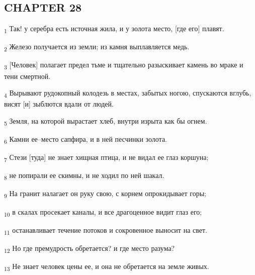 \subsection{CHAPTER 28}
\begin{tcolorbox}
\textsubscript{1} Так! у серебра есть источная жила, и у золота место, [где его] плавят.
\end{tcolorbox}
\begin{tcolorbox}
\textsubscript{2} Железо получается из земли; из камня выплавляется медь.
\end{tcolorbox}
\begin{tcolorbox}
\textsubscript{3} [Человек] полагает предел тьме и тщательно разыскивает камень во мраке и тени смертной.
\end{tcolorbox}
\begin{tcolorbox}
\textsubscript{4} Вырывают рудокопный колодезь в местах, забытых ногою, спускаются вглубь, висят [и] зыблются вдали от людей.
\end{tcolorbox}
\begin{tcolorbox}
\textsubscript{5} Земля, на которой вырастает хлеб, внутри изрыта как бы огнем.
\end{tcolorbox}
\begin{tcolorbox}
\textsubscript{6} Камни ее--место сапфира, и в ней песчинки золота.
\end{tcolorbox}
\begin{tcolorbox}
\textsubscript{7} Стези [туда] не знает хищная птица, и не видал ее глаз коршуна;
\end{tcolorbox}
\begin{tcolorbox}
\textsubscript{8} не попирали ее скимны, и не ходил по ней шакал.
\end{tcolorbox}
\begin{tcolorbox}
\textsubscript{9} На гранит налагает он руку свою, с корнем опрокидывает горы;
\end{tcolorbox}
\begin{tcolorbox}
\textsubscript{10} в скалах просекает каналы, и все драгоценное видит глаз его;
\end{tcolorbox}
\begin{tcolorbox}
\textsubscript{11} останавливает течение потоков и сокровенное выносит на свет.
\end{tcolorbox}
\begin{tcolorbox}
\textsubscript{12} Но где премудрость обретается? и где место разума?
\end{tcolorbox}
\begin{tcolorbox}
\textsubscript{13} Не знает человек цены ее, и она не обретается на земле живых.
\end{tcolorbox}
